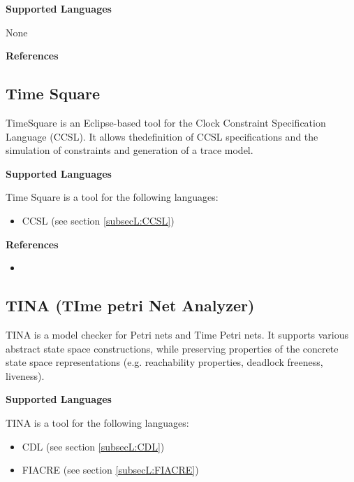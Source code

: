 
\textbf{Supported Languages}

None


\textbf{References}




\subsection{Time Square}
\label{subsecT:TimeSquare}


TimeSquare is an Eclipse-based tool for the Clock Constraint Specification Language (CCSL). It allows thedefinition of CCSL specifications and the simulation of constraints and generation of a trace model.

\textbf{Supported Languages}

Time Square is a tool for the following languages:
\begin{itemize}
	\item CCSL (see section \ref{subsecL:CCSL})
\end{itemize}


\textbf{References}
\begin{itemize}
	
\item {}
\end{itemize}



\subsection{TINA (TIme petri Net Analyzer)}
\label{subsecT:TINA}


TINA is a model checker for Petri nets and Time Petri nets. It supports various abstract state space constructions, while preserving properties of the concrete state space representations (e.g. reachability properties, deadlock freeness, liveness).

\textbf{Supported Languages}

TINA is a tool for the following languages:
\begin{itemize}
	\item CDL (see section \ref{subsecL:CDL})
	\item FIACRE (see section \ref{subsecL:FIACRE})
\end{itemize}


